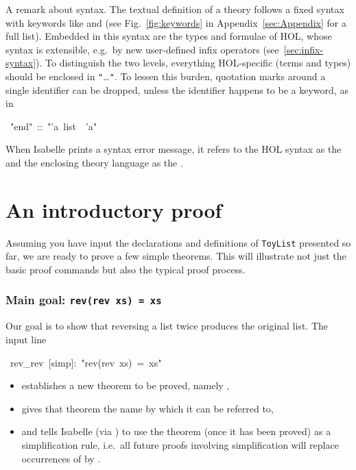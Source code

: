 \begin{isabelle}
\begin{isamarkuptext}
A remark about syntax.  The textual definition of a theory follows a fixed
syntax with keywords like  and  (see
Fig.~\ref{fig:keywords} in Appendix~\ref{sec:Appendix} for a full list).
Embedded in this syntax are the types and formulae of HOL, whose syntax is
extensible, e.g.\ by new user-defined infix operators
(see~\ref{sec:infix-syntax}). To distinguish the two levels, everything
HOL-specific (terms and types) should be enclosed in
\texttt{"}\dots\texttt{"}. 
To lessen this burden, quotation marks around a single identifier can be
dropped, unless the identifier happens to be a keyword, as in%
\end{isamarkuptext}%
\ {"}end{"}\ ::\ {"}'a\ list\ {\isasymRightarrow}\ 'a{"}%
\begin{isamarkuptext}%
\noindent
When Isabelle prints a syntax error message, it refers to the HOL syntax as
the  and the enclosing theory language as the .


\section{An introductory proof}
\label{sec:intro-proof}

Assuming you have input the declarations and definitions of \texttt{ToyList}
presented so far, we are ready to prove a few simple theorems. This will
illustrate not just the basic proof commands but also the typical proof
process.

\subsubsection*{Main goal: \texttt{rev(rev xs) = xs}}

Our goal is to show that reversing a list twice produces the original
list. The input line%
\end{isamarkuptext}%
\ rev\_rev\ [simp]:\ {"}rev(rev\ xs)\ =\ xs{"}%
\begin{isamarkuptxt}%
\begin{itemize}
\item
establishes a new theorem to be proved, namely ,
\item
gives that theorem the name  by which it can be referred to,
\item
and tells Isabelle (via \isa{[simp]}) to use the theorem (once it has been
proved) as a simplification rule, i.e.\ all future proofs involving
simplification will replace occurrences of  by
.


\end{itemize}
\end{isamarkuptxt}
\end{isabelle}
